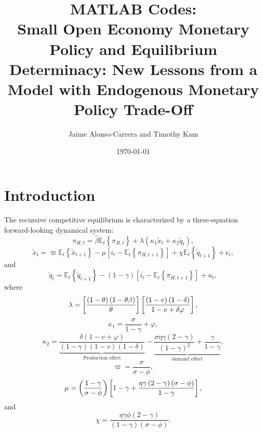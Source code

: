 \documentclass[11pt]{article}
\title{MATLAB Codes: \\
	Small Open Economy Monetary Policy and Equilibrium Determinacy:
	New Lessons from a Model with Endogenous Monetary Policy Trade-Off }
\author{Jaime Alonso-Carrera and Timothy Kam}
\date{\today} %
\begin{document}
\maketitle
\tableofcontents
\newpage

\section{Introduction}

The recursive competitive equilibrium is characterized by a three-equation forward-looking dynamical system:
\begin{equation}
\pi _{H,t}=\widehat{\beta }\mathbb{E}_{t}\left\{ \pi _{H,t}\right\} +\lambda
\left( \kappa _{1}\widetilde{x}_{t}+\kappa _{2}\widetilde{q}_{t}\right) ,
\label{Phillips}
\end{equation}%
\begin{equation}
\widetilde{x}_{t}=\varpi \mathbb{E}_{t}\left\{ \widetilde{x}_{t+1}\right\}
-\mu \left[ i_{t}-\mathbb{E}_{t}\left\{ \pi _{H,t+1}\right\} \right] +\chi 
\mathbb{E}_{t}\left\{ \widetilde{q}_{t+1}\right\} +\epsilon _{t},
\label{is equation}
\end{equation}%
and 
\begin{equation}
\widetilde{q}_{t}=\mathbb{E}_{t}\left\{ \widetilde{q}_{t+1}\right\} -\left(
1-\gamma \right) \left[ i_{t}-\mathbb{E}_{t}\left\{ \pi _{H,t+1}\right\} %
\right] +u_{t},  \label{exchange dynamics}
\end{equation}%
where%
\begin{equation*}
\lambda =\left[ \frac{\left( 1-\theta \right) \left( 1-\theta \beta \right) 
}{\theta }\right] \left[ \frac{\left( 1-v\right) \left( 1-\delta \right) }{%
1-v+\delta \varphi }\right] ,
\end{equation*}%
\begin{equation*}
\kappa _{1}=\frac{\sigma }{1-\gamma }+\varphi ,
\end{equation*}%
\begin{equation*}
\kappa _{2}=\underset{\text{Production effect}}{\underbrace{\frac{\delta
(1-v+\varphi )}{\left( 1-\gamma \right) \left( 1-v\right) (1-\delta )}}}-%
\underset{\text{demand effect}}{\underbrace{\frac{\sigma \eta \gamma \left(
2-\gamma \right) }{\left( 1-\gamma \right) ^{2}}+\frac{\gamma }{1-\gamma }}},
\end{equation*}%
\begin{equation*}
\varpi =\frac{\sigma }{\sigma -\phi },
\end{equation*}%
\begin{equation*}
\mu =\left( \frac{1-\gamma }{\sigma -\phi }\right) \left[ 1-\gamma +\frac{%
\eta \gamma \left( 2-\gamma \right) \left( \sigma -\phi \right) }{1-\gamma }%
\right] ,
\end{equation*}%
and%
\begin{equation*}
\chi =\frac{\eta \gamma \phi \left( 2-\gamma \right) }{\left( 1-\gamma
\right) \left( \sigma -\phi \right) }.
\end{equation*}
\end{document}
